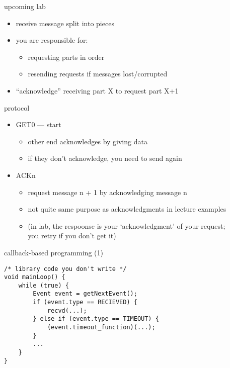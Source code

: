 \begin{frame}{upcoming lab}
    \begin{itemize}
    \item receive message split into pieces
    \item you are responsible for:
        \begin{itemize}
        \item requesting parts in order
        \item resending requests if messages lost/corrupted
        \end{itemize}
    \item ``acknowledge'' receiving part X to request part X+1
    \end{itemize}
\end{frame}

\begin{frame}{protocol}
    \begin{itemize}
    \item GET0 --- start
        \begin{itemize}
        \item other end acknowledges by giving data
        \item if they don't acknowledge, you need to send again
        \end{itemize}
    \item ACKn 
        \begin{itemize}
        \item request message n + 1 by acknowledging message n
        \item not quite same purpose as acknowledgments in lecture examples
        \item (in lab, the respoonse is your `acknowledgment' of your request; \\
            you retry if you don't get it)
        \end{itemize}
    \end{itemize}
\end{frame}


\begin{frame}[fragile]{callback-based programming (1)}
\begin{Verbatim}[fontsize=\small]
/* library code you don't write */
void mainLoop() {
    while (true) {
        Event event = getNextEvent();
        if (event.type == RECIEVED) {
            recvd(...);
        } else if (event.type == TIMEOUT) {
            (event.timeout_function)(...);
        }
        ...
    }
}
\end{Verbatim}
\end{frame}

